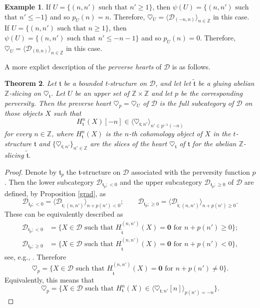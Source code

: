 \documentclass{article}
\newtheorem{thm}{Theorem}[section]
\theoremstyle{definition}
\newtheorem{exmp}[thm]{Example}
\newcommand{\Z}{\mathbb{Z}}
\newcommand{\tee}{\mathfrak{t}}
\begin{document}
\begin{exmp}
If $U=\{(n,n')\text{ such that } n'\geq 1\}$, then $\psi(U)=\{(n,n')\text{ such}$ $\text{that } n'\leq -1\}$ and so $p_U(n)=n$. Therefore, $\heartsuit_U=\langle \mathscr{D}_{(-n,n)}\rangle_{n\in \Z}$ in this case. If $U=\{(n,n')\text{ such that } n\geq 1\}$, then $\psi(U)=\{(n,n')\text{ such that } n'\leq -n-1\}$ and so $p_U(n)=0$. Therefore, $\heartsuit_U=\langle \mathscr{D}_{(0,n)}\rangle_{n\in \Z}$ in this case.
\end{exmp}
A more explict description of the \emph{perverse hearts} of $\mathscr{D}$ is as follows.
\begin{thm}\label{perverse-heart}
Let $\mathfrak{t}$ be a bounded t-structure on $\mathscr{D}$, and let let $\tilde{\tee}$ be a gluing abelian $\mathbb{Z}$-slicing on $\heartsuit_{\mathfrak{t}}$. Let $U$ be an upper set of $\Z\times \Z$ and let $p$ be the corresponding perversity. Then the preverse heart $\heartsuit_p=\heartsuit_U$ of $\mathscr{D}$ is the full subcategory of $\mathscr{D}$ on those objects $X$ such that 
\[
H_\tee^{n}(X)[-n]\in \langle \heartsuit_{\tee;n'}\rangle_{n'\in p^{-1}(-n)}
\]
for every $n\in \Z$, where $H_\tee^{n}(X)$ is the $n$-th cohomology object of $X$ in the $t$-structure $\tee$ and $\{\heartsuit_{\tee;n'}\}_{n'\in \Z}$ are the slices of the heart $\heartsuit_\tee$ of $\tee$ for the abelian $\Z$-slicing $\tilde{\tee}$.
 \end{thm}
 \begin{proof}
 Denote by $\tee_p$ the $\tee$-structure on $\mathscr{D}$ associated with the perversity function $p$. Then the lower subcategory $\mathscr{D}_{\tee_p;<0}$ and the upper subcategory $\mathscr{D}_{\tee_p;\geq 0}$ of $\mathscr{D}$ are defined, by Proposition \ref{grad}, as 
 \[
 \mathscr{D}_{\tee_p;<0}=\langle \mathscr{D}_{\tilde{\tee};(n,n')}\rangle_{n+p(n')<0}; \qquad \mathscr{D}_{\tee_p;\geq 0}=\langle \mathscr{D}_{\tilde{\tee};(n,n')}\rangle_{n+p(n')\geq 0}.
 \]
 These can be equivalently described as
\begin{align*}
 \mathscr{D}_{\tee_p;<0}&=\{X\in \mathscr{D}\text { such that } H_{\tilde{\tee}}^{(n,n')}(X)=\mathbf{0}\text{ for } n+p(n')\geq 0\};\\
   \mathscr{D}_{\tee_p;\geq 0}&=\{X\in \mathscr{D}\text { such that } H_{\tilde{\tee}}^{(n,n')}(X)=\mathbf{0}\text{ for } n+p(n')< 0\},
\end{align*}
 see, e.g., \cite[Remark 4.27]{fosco}. Therefore
 \[
 \heartsuit_p=\{X\in \mathscr{D}\text{ such that } H_{\tilde{\tee}}^{(n,n')}(X)=\mathbf{0}\text{ for } n+p(n')\neq 0\}.
 \]
 Equivalently, this means that
  \[
 \heartsuit_p=\{X\in \mathscr{D}\text{ such that } H_{\tee}^{n}(X)\in \langle \heartsuit_{\tee;n'}[n]\rangle_{p(n')=-n}\}.
 \]
\end{proof}
\end{document}
